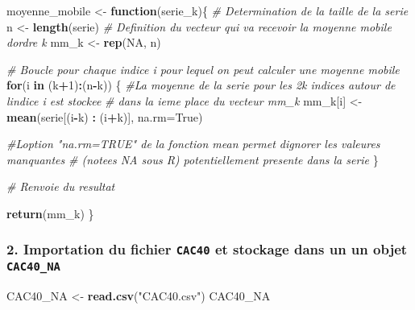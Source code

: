 \documentclass[
]{article}
\newenvironment{Shaded}{\begin{snugshade}}{\end{snugshade}}
\newcommand{\AttributeTok}[1]{\textcolor[rgb]{0.13,0.29,0.53}{#1}}
\newcommand{\CommentTok}[1]{\textcolor[rgb]{0.56,0.35,0.01}{\textit{#1}}}
\newcommand{\ConstantTok}[1]{\textcolor[rgb]{0.56,0.35,0.01}{#1}}
\newcommand{\ControlFlowTok}[1]{\textcolor[rgb]{0.13,0.29,0.53}{\textbf{#1}}}
\newcommand{\DecValTok}[1]{\textcolor[rgb]{0.00,0.00,0.81}{#1}}
\newcommand{\FunctionTok}[1]{\textcolor[rgb]{0.13,0.29,0.53}{\textbf{#1}}}
\newcommand{\NormalTok}[1]{#1}
\newcommand{\OtherTok}[1]{\textcolor[rgb]{0.56,0.35,0.01}{#1}}
\newcommand{\SpecialCharTok}[1]{\textcolor[rgb]{0.81,0.36,0.00}{\textbf{#1}}}
\newcommand{\StringTok}[1]{\textcolor[rgb]{0.31,0.60,0.02}{#1}}
\begin{document}
\begin{Shaded}
\begin{Highlighting}[]
\NormalTok{moyenne\_mobile }\OtherTok{\textless{}{-}} \ControlFlowTok{function}\NormalTok{(serie\_k)\{}
\CommentTok{\# Determination de la taille de la serie }
\NormalTok{n }\OtherTok{\textless{}{-}} \FunctionTok{length}\NormalTok{(serie)}
\CommentTok{\# Definition du vecteur qui va recevoir la moyenne mobile d\textquotesingle{}ordre k }
\NormalTok{mm\_k }\OtherTok{\textless{}{-}} \FunctionTok{rep}\NormalTok{(}\ConstantTok{NA}\NormalTok{, n)}


\CommentTok{\# Boucle pour chaque indice i pour lequel on peut calculer une moyenne mobile }
\ControlFlowTok{for}\NormalTok{(i }\ControlFlowTok{in}\NormalTok{ (k}\SpecialCharTok{+}\DecValTok{1}\NormalTok{)}\SpecialCharTok{:}\NormalTok{(n}\SpecialCharTok{{-}}\NormalTok{k)) \{}
  \CommentTok{\#La moyenne de la serie pour les 2k indices autour de l\textquotesingle{}indice i est stockee }
  \CommentTok{\# dans la ieme place du vecteur mm\_k}
\NormalTok{  mm\_k[i] }\OtherTok{\textless{}{-}} \FunctionTok{mean}\NormalTok{(serie[(i}\SpecialCharTok{{-}}\NormalTok{k) }\SpecialCharTok{:}\NormalTok{ (i}\SpecialCharTok{+}\NormalTok{k)], }\AttributeTok{na.rm=}\NormalTok{True)}
  
  \CommentTok{\#L\textquotesingle{}option "na.rm=TRUE" de la fonction mean permet d\textquotesingle{}ignorer les valeures manquantes}
  \CommentTok{\# (notees NA sous R) potentiellement presente dans la serie}
\NormalTok{  \}}
  


\CommentTok{\# Renvoie du resultat }

\FunctionTok{return}\NormalTok{(mm\_k)}
\NormalTok{\}}
\end{Highlighting}
\end{Shaded}

\subsubsection{\texorpdfstring{2. Importation du fichier \texttt{CAC40}
et stockage dans un un objet
\texttt{CAC40\_NA}}{2. Importation du fichier CAC40 et stockage dans un un objet CAC40\_NA}}\label{importation-du-fichier-cac40-et-stockage-dans-un-un-objet-cac40_na}

\begin{Shaded}
\begin{Highlighting}[]
\NormalTok{CAC40\_NA }\OtherTok{\textless{}{-}} \FunctionTok{read.csv}\NormalTok{(}\StringTok{"CAC40.csv"}\NormalTok{)}
\NormalTok{CAC40\_NA}
\end{Highlighting}
\end{Shaded}
\end{document}
